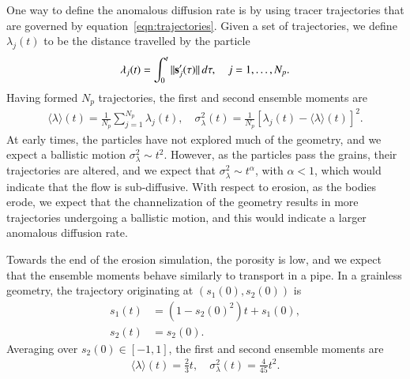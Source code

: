 \documentclass[preprint, 10pt]{elsarticle}
\begin{document}
One way to define the anomalous diffusion rate is by using tracer
trajectories that are governed by equation~\eqref{eqn:trajectories}.
Given a set of trajectories, we define $\lambda_j(t)$ to be the distance
travelled by the particle
\begin{align}
  \lambda_j(t) = \int_{0}^t \|\ss'_j(\tau)\|\, d\tau, 
    \quad j=1,\ldots,N_p.
\end{align}
Having formed $N_p$ trajectories, the first and second ensemble moments
are
\begin{align}
  \langle \lambda \rangle (t) = 
    \frac{1}{N_p} \sum_{j=1}^{N_p} \lambda_j(t), \quad 
    \sigma_\lambda^2(t) = \frac{1}{N_p} 
    \left[\lambda_j(t) - \langle \lambda \rangle(t) \right]^2.
\end{align}
At early times, the particles have not explored much of the geometry,
and we expect a ballistic motion $\sigma_\lambda^2 \sim t^2$.  However,
as the particles pass the grains, their trajectories are altered, and we
expect that $\sigma_\lambda^2 \sim t^\alpha$, with $\alpha < 1$, which
would indicate that the flow is sub-diffusive.  With respect to erosion,
as the bodies erode, we expect that the channelization of the geometry
results in more trajectories undergoing a ballistic motion, and this
would indicate a larger anomalous diffusion rate.

Towards the end of the erosion simulation, the porosity is low, and we
expect that the ensemble moments behave similarly to transport in a
pipe.  In a grainless geometry, the trajectory originating at
$(s_1(0),s_2(0))$ is
\begin{align}
  s_1(t) &= (1-s_2(0)^2)t + s_1(0), \\
  s_2(t) &= s_2(0).
\end{align}
Averaging over $s_2(0) \in [-1,1]$, the first and second ensemble
moments are
\begin{align}
  \langle \lambda \rangle (t) = \frac{2}{3}t, \quad 
    \sigma_\lambda^2(t) = \frac{4}{45}t^2.
\end{align}


\end{document}
